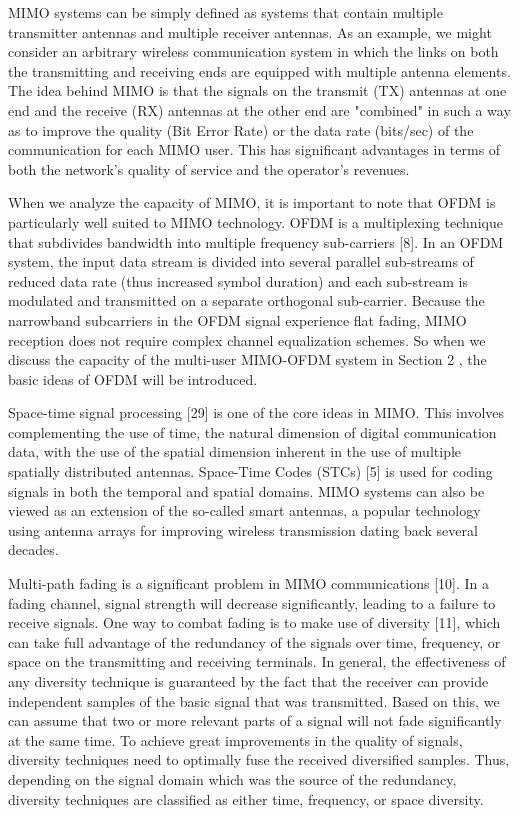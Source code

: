 MIMO systems can be simply defined as systems that contain multiple
transmitter antennas and multiple receiver antennas. As an example,
we might consider an arbitrary wireless communication system in
which the links on both the transmitting and receiving ends are
equipped with multiple antenna elements. The idea behind MIMO is
that the signals on the transmit (TX) antennas at one end and the
receive (RX) antennas at the other end are "combined" in such a way
as to improve the quality (Bit Error Rate) or the data rate
(bits/sec) of the communication for each MIMO user. This has
significant advantages in terms of both the network's quality of
service and the operator's revenues.

When we analyze the capacity of MIMO, it is important to note that
OFDM is particularly well suited to MIMO technology. OFDM is a
multiplexing technique that subdivides bandwidth into multiple
frequency sub-carriers [8]. In an OFDM system, the input data stream
is divided into several parallel sub-streams of reduced data rate
(thus increased symbol duration) and each sub-stream is modulated
and transmitted on a separate orthogonal sub-carrier. Because the
narrowband subcarriers in the OFDM signal experience flat fading,
MIMO reception does not require complex channel equalization
schemes. So when we discuss the capacity of the multi-user MIMO-OFDM
system in Section 2 , the basic ideas of OFDM will be introduced.

Space-time signal processing [29] is one of the core ideas in MIMO.
This involves complementing the use of time, the natural dimension
of digital communication data, with the use of the spatial dimension
inherent in the use of multiple spatially distributed antennas.
Space-Time Codes (STCs) [5] is used for coding signals in both the
temporal and spatial domains. MIMO systems can also be viewed as an
extension of the so-called smart antennas, a popular technology
using antenna arrays for improving wireless transmission dating back
several decades.

Multi-path fading is a significant problem in MIMO communications
[10]. In a fading channel, signal strength will decrease
significantly, leading to a failure to receive signals. One way to
combat fading is to make use of diversity [11], which can take full
advantage of the redundancy of the signals over time, frequency, or
space on the transmitting and receiving terminals. In general, the
effectiveness of any diversity technique is guaranteed by the fact
that the receiver can provide independent samples of the basic
signal that was transmitted. Based on this, we can assume that two
or more relevant parts of a signal will not fade significantly at
the same time. To achieve great improvements in the quality of
signals, diversity techniques need to optimally fuse the received
diversified samples. Thus, depending on the signal domain which was
the source of the redundancy, diversity techniques are classified as
either time, frequency, or space diversity.

